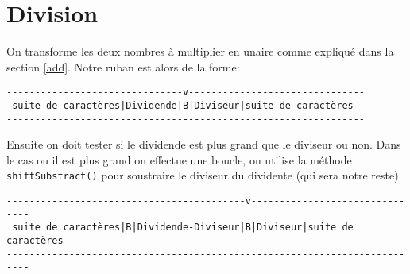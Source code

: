 \documentclass[a4paper,11pt]{article}
\begin{document}
\section{Division}
On transforme les deux nombres à multiplier en unaire comme expliqué dans la section \ref{add}. Notre ruban est alors de la forme:
\begin{small}
\begin{verbatim}
-------------------------------v-------------------------------
 suite de caractères|Dividende|B|Diviseur|suite de caractères
---------------------------------------------------------------
\end{verbatim}
\end{small}
Ensuite on doit tester si le dividende est plus grand que le diviseur ou non. 
Dans le cas ou il est plus grand on effectue une boucle, on utilise la méthode \texttt{shiftSubstract()} pour soustraire le diviseur du dividente (qui sera notre reste).
\begin{small}
\begin{verbatim}
------------------------------------------v-------------------------------
 suite de caractères|B|Dividende-Diviseur|B|Diviseur|suite de caractères
--------------------------------------------------------------------------
\end{verbatim}
\end{small}
\end{document}
